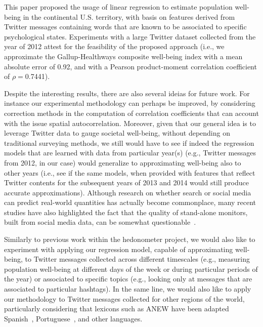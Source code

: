 \documentclass{acm_proc_article-sp}
\begin{document}
This paper proposed the usage of linear regression to estimate population well-being in the continental U.S. territory, with basis on features derived from Twitter messages containing words that are known to be associated to specific psychological states. Experiments with a large Twitter dataset collected from the year of 2012 attest for the feasibility of the proposed approach (i.e., we approximate the Gallup-Healthways composite well-being index with a mean absolute error of 0.92, and with a Pearson product-moment correlation coefficient of $\rho=$0.7441).

Despite the interesting results, there are also several ideias for future work. For instance our experimental methodology can perhaps be improved, by considering correction methods in the computation of correlation coefficients that can account with the issue spatial autocorrelation. Moreover, given that our general idea is to leverage Twitter data to gauge societal well-being, without depending on traditional surveying methods, we still would have to see if indeed the regression models that are learned with data from particular year(s) (e.g., Twitter messages from 2012, in our case) would generalize to approximating well-being also to other years (i.e., see if the same models, when provided with features that reflect Twitter contents for the subsequent years of 2013 and 2014 would still produce accurate approximations). Although research on whether search or social media can predict real-world quantities has actually become commonplace, many recent studies have also highlighted the fact that the quality of stand-alone monitors, built from social media data, can be somewhat questionable~\cite{Lazer14Science,Daniel14Meta}.

Similarly to previous work within the hedonometer project, we would also like to experiment with applying our regression model, capable of approximating well-being, to Twitter messages collected across different timescales (e.g., measuring population well-being at different days of the week or during particular periods of the year) or associated to specific topics (e.g., looking only at messages that are associated to particular hashtags). In the same line, we would also like to apply our methodology to Twitter messages collected for other regions of the world, particularly considering that lexicons such as ANEW have been adapted Spanish~\cite{ANEWES}, Portuguese~\cite{ANEWPT}, and other languages.
\end{document}
